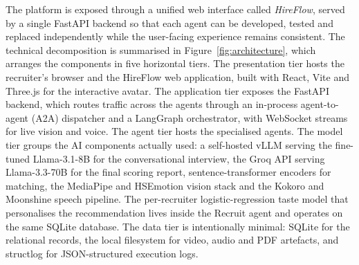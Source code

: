 The platform is exposed through a unified web interface called
\emph{HireFlow}, served by a single FastAPI backend so that each agent can
be developed, tested and replaced independently while the user-facing
experience remains consistent. The technical decomposition is summarised
in Figure~\ref{fig:architecture}, which arranges the components in five
horizontal tiers. The presentation tier hosts the recruiter's browser and
the HireFlow web application, built with React, Vite and Three.js for the
interactive avatar. The application tier exposes the FastAPI backend,
which routes traffic across the agents through an in-process
agent-to-agent (A2A) dispatcher and a LangGraph orchestrator, with
WebSocket streams for live vision and voice. The agent tier hosts the
specialised agents. The model tier groups the AI components actually
used: a self-hosted vLLM serving the fine-tuned Llama-3.1-8B for the
conversational interview, the Groq API serving Llama-3.3-70B for the
final scoring report, sentence-transformer encoders for matching, the
MediaPipe and HSEmotion vision stack and the Kokoro and Moonshine speech
pipeline. The per-recruiter logistic-regression taste model that
personalises the recommendation lives inside the Recruit agent and
operates on the same SQLite database. The data tier is intentionally minimal: SQLite for the
relational records, the local filesystem for video, audio and PDF
artefacts, and structlog for JSON-structured execution logs.

